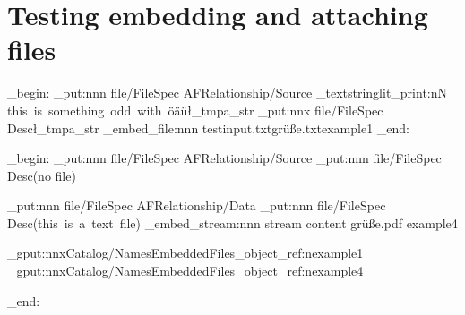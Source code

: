 \documentclass{article}
\begin{document}
\section{Testing embedding and attaching files}
\ExplSyntaxOn
\group_begin:
\pdfdict_put:nnn  {file/FileSpec} {AFRelationship}{/Source}
\pdftool_textstringlit_print:nN {this~is~something~odd~with~öäü}\l_tmpa_str
\pdfdict_put:nnx  {file/FileSpec} {Desc}{\l_tmpa_str}
\pdffile_embed_file:nnn {testinput.txt}{grüße.txt}{example1}
\group_end:



\group_begin:
\pdfdict_put:nnn  {file/FileSpec} {AFRelationship}{/Source}
\pdfdict_put:nnn  {file/FileSpec} {Desc}{(no file)}

\pdfdict_put:nnn  {file/FileSpec} {AFRelationship}{/Data}
\pdfdict_put:nnn  {file/FileSpec} {Desc}{(this~is~a~text~file)}
\pdffile_embed_stream:nnn {stream content} {grüße.pdf} {example4}



\pdfcoredict_gput:nnx{Catalog/Names}{EmbeddedFiles}{\pdf_object_ref:n{example1}}
\pdfcoredict_gput:nnx{Catalog/Names}{EmbeddedFiles}{\pdf_object_ref:n{example4}}

\group_end:
\end{document}
